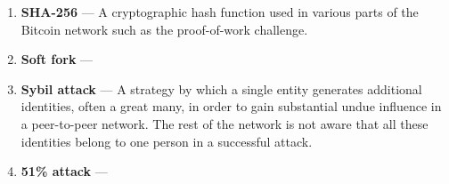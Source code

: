 \documentclass[11pt]{article}
\begin{document}
\begin{enumerate}
        \item \textbf{SHA-256} --- A cryptographic hash function used in various parts of the Bitcoin network such as the proof-of-work challenge.
        \item \textbf{Soft fork} --- 
        \item \textbf{Sybil attack} --- A strategy by which a single entity generates additional identities, often a great many, in order to gain substantial undue influence in a peer-to-peer network. The rest of the network is not aware that all these identities belong to one person in a successful attack.
        \item \textbf{51\% attack} --- 
    \end{enumerate}
\end{document}
